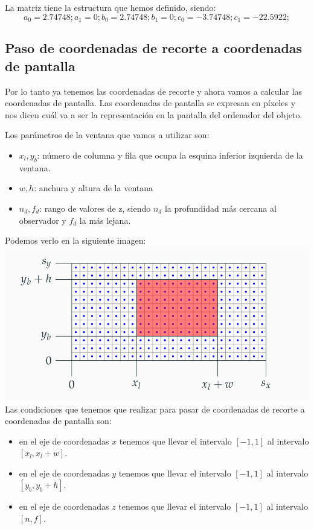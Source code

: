 \documentclass[a4paper,11pt, oneside]{book}
\begin{document}
La matriz tiene la estructura que hemos definido, siendo:
$$a_0 = 2.74748;
a_1 = 0;
b_0 = 2.74748;
b_1 = 0;
c_0 = -3.74748;
c_1 = -22.5922;
$$

\subsection{Paso de coordenadas de recorte a coordenadas de pantalla}
Por lo tanto ya tenemos las coordenadas de recorte y ahora vamos a calcular las coordenadas de pantalla. Las coordenadas de pantalla se expresan en píxeles y nos dicen cuál va a ser la representación en la pantalla del ordenador del objeto.

Los parámetros de la ventana que vamos a utilizar son:
\begin{itemize}
	\item $x_l, y_b$: número de columna y fila que ocupa la esquina inferior izquierda de la ventana.
	\item $w,h$: anchura y altura de la ventana
	\item $n_d, f_d$: rango de valores de z, siendo $n_d$ la profundidad más cercana al observador y $f_d$ la más lejana.
\end{itemize}
Podemos verlo en la siguiente imagen:
\\

\includegraphics[scale=0.2]{viewport}
\\

Las condiciones que tenemos que realizar para pasar de coordenadas de recorte a coordenadas de pantalla son:
\begin{itemize}
	\item en el eje de coordenadas $x$ tenemos que llevar el intervalo $[-1,1]$ al intervalo $[x_l, x_l+w]$.
	\item en el eje de coordenadas $y$ tenemos que llevar el intervalo $[-1,1]$ al intervalo $[y_b, y_b+h]$.
	\item en el eje de coordenadas $z$ tenemos que llevar el intervalo $[-1,1]$ al intervalo $[n, f]$.
\end{itemize}
\end{document}
